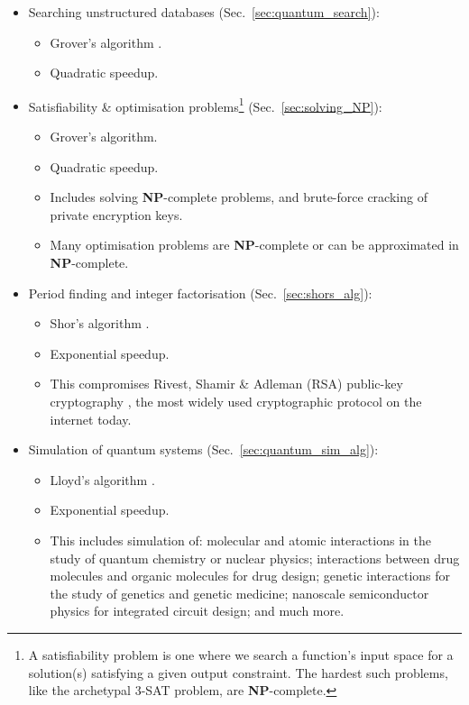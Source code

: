 \begin{itemize}
	\item Searching unstructured databases (Sec.~\ref{sec:quantum_search}):
		\begin{itemize}
		\item Grover's algorithm \cite{bib:Grover96}.
		\item Quadratic speedup.
		\end{itemize}
	\item Satisfiability \& optimisation problems\footnote{A satisfiability problem is one where we search a function's input space for a solution(s) satisfying a given output constraint. The hardest such problems, like the archetypal 3-\textsc{SAT} problem, are \textbf{NP}-complete.} (Sec.~\ref{sec:solving_NP}):
		\begin{itemize}
			\item Grover's algorithm.
			\item Quadratic speedup.
			\item Includes solving \textbf{NP}-complete problems, and brute-force cracking of private encryption keys.
			\item Many optimisation problems are \textbf{NP}-complete or can be approximated in \textbf{NP}-complete.
			\end{itemize}
	\item Period finding and integer factorisation (Sec.~\ref{sec:shors_alg}):
		\begin{itemize}
		\item Shor's algorithm \cite{bib:ShorFactor}.
		\item Exponential speedup.
		\item This compromises Rivest, Shamir \& Adleman (RSA) public-key cryptography \cite{bib:RSA}, the most widely used cryptographic protocol on the internet today.
		\end{itemize}
	\item Simulation of quantum systems (Sec.~\ref{sec:quantum_sim_alg}):
		\begin{itemize}
			\item Lloyd's algorithm \cite{bib:lloyd1996universal}.
			\item Exponential speedup.
			\item This includes simulation of: molecular and atomic interactions in the study of quantum chemistry or nuclear physics; interactions between drug molecules and organic molecules for drug design; genetic interactions for the study of genetics and genetic medicine; nanoscale semiconductor physics for integrated circuit design; and much more.

\end{itemize}
\end{itemize}
